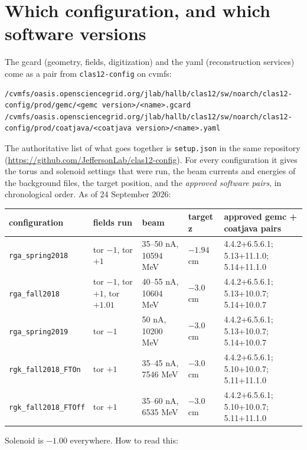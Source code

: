 \documentclass[11pt]{article}
\begin{document}
\section{Which configuration, and which software versions}
The gcard (geometry, fields, digitization) and the yaml (reconstruction services) come as a pair
from \texttt{clas12-config} on cvmfs:
\begin{lstlisting}
/cvmfs/oasis.opensciencegrid.org/jlab/hallb/clas12/sw/noarch/clas12-config/prod/gemc/<gemc version>/<name>.gcard
/cvmfs/oasis.opensciencegrid.org/jlab/hallb/clas12/sw/noarch/clas12-config/prod/coatjava/<coatjava version>/<name>.yaml
\end{lstlisting}
The authoritative list of what goes together is \texttt{setup.json} in the same repository
(\url{https://github.com/JeffersonLab/clas12-config}). For every configuration it gives the torus
and solenoid settings that were run, the beam currents and energies of the background files, the
target position, and the \emph{approved software pairs}, in chronological order. As of 24 September
2026:
\begin{center}
\small
\begin{tabular}{lllll}
\toprule
configuration & fields run & beam & target z & approved gemc + coatjava pairs \\
\midrule
\texttt{rga\_spring2018} & tor $-1$, tor $+1$ & 35--50 nA, 10594 MeV & $-1.94$ cm & 4.4.2+6.5.6.1; 5.13+11.1.0; 5.14+11.1.0 \\
\texttt{rga\_fall2018}   & tor $-1$, tor $+1$, tor $+1.01$ & 40--55 nA, 10604 MeV & $-3.0$ cm & 4.4.2+6.5.6.1; 5.13+10.0.7; 5.14+10.0.7 \\
\texttt{rga\_spring2019} & tor $-1$ & 50 nA, 10200 MeV & $-3.0$ cm & 4.4.2+6.5.6.1; 5.13+10.0.7; 5.14+10.0.7 \\
\texttt{rgk\_fall2018\_FTOn}  & tor $+1$ & 35--45 nA, 7546 MeV & $-3.0$ cm & 4.4.2+6.5.6.1; 5.10+10.0.7; 5.11+11.1.0 \\
\texttt{rgk\_fall2018\_FTOff} & tor $+1$ & 35--60 nA, 6535 MeV & $-3.0$ cm & 4.4.2+6.5.6.1; 5.10+10.0.7; 5.11+11.1.0 \\
\bottomrule
\end{tabular}
\end{center}
Solenoid is $-1.00$ everywhere. How to read this:
\end{document}
